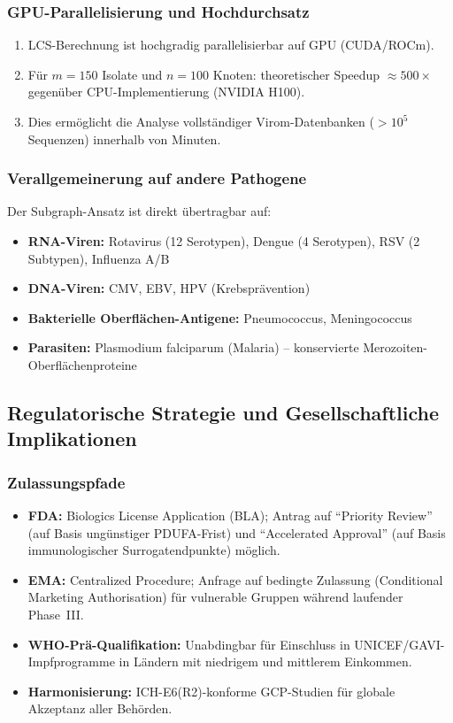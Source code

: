 ﻿\documentclass[a4paper,12pt]{article}
\theoremstyle{plain}
\theoremstyle{definition}
\theoremstyle{remark}
\begin{document}
\subsubsection{GPU-Parallelisierung und Hochdurchsatz}

\begin{enumerate}
  \item LCS-Berechnung ist hochgradig parallelisierbar auf GPU (CUDA/ROCm).
  \item Für $m=150$ Isolate und $n=100$ Knoten: theoretischer Speedup $\approx500\times$
        gegenüber CPU-Implementierung (NVIDIA H100).
  \item Dies ermöglicht die Analyse vollständiger Virom-Datenbanken ($>10^5$ Sequenzen)
        innerhalb von Minuten.
\end{enumerate}

\subsubsection{Verallgemeinerung auf andere Pathogene}

Der Subgraph-Ansatz ist direkt übertragbar auf:

\begin{itemize}
  \item \textbf{RNA-Viren:} Rotavirus (12 Serotypen), Dengue (4 Serotypen),
        RSV (2 Subtypen), Influenza A/B
  \item \textbf{DNA-Viren:} CMV, EBV, HPV (Krebsprävention)
  \item \textbf{Bakterielle Oberflächen-Antigene:} Pneumococcus, Meningococcus
  \item \textbf{Parasiten:} Plasmodium falciparum (Malaria) -- konservierte Merozoiten-
        Oberflächenproteine
\end{itemize}

\subsection{Regulatorische Strategie und Gesellschaftliche Implikationen}

\subsubsection{Zulassungspfade}

\begin{itemize}
  \item \textbf{FDA:} Biologics License Application (BLA); Antrag auf
        ``Priority Review'' (auf Basis ungünstiger PDUFA-Frist) und
        ``Accelerated Approval'' (auf Basis immunologischer Surrogatendpunkte) möglich.
  \item \textbf{EMA:} Centralized Procedure; Anfrage auf bedingte Zulassung
        (Conditional Marketing Authorisation) für vulnerable Gruppen während laufender Phase~III.
  \item \textbf{WHO-Prä-Qualifikation:} Unabdingbar für Einschluss in UNICEF/GAVI-
        Impfprogramme in Ländern mit niedrigem und mittlerem Einkommen.
  \item \textbf{Harmonisierung:} ICH-E6(R2)-konforme GCP-Studien für globale
        Akzeptanz aller Behörden.
\end{itemize}
\end{document}
